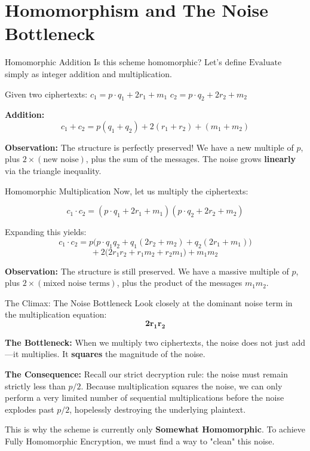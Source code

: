 \documentclass[10pt, aspectratio=169]{beamer}
\begin{document}
\section{Homomorphism and The Noise Bottleneck}
\begin{frame}{Homomorphic Addition}
    Is this scheme homomorphic? Let's define $\text{Evaluate}$ simply as integer addition and multiplication. 
    
    \vspace{0.2cm}
    Given two ciphertexts: 
    $c_1 = p \cdot q_1 + 2r_1 + m_1$ 
    $c_2 = p \cdot q_2 + 2r_2 + m_2$
    \pause
    
    \vspace{0.3cm}
    \textbf{Addition:}
    $$c_1 + c_2 = p(q_1 + q_2) + 2(r_1 + r_2) + (m_1 + m_2)$$
    \pause
    
    \vspace{0.2cm}
    \textbf{Observation:}
    The structure is perfectly preserved! We have a new multiple of $p$, plus $2 \times (\text{new noise})$, plus the sum of the messages. The noise grows \textbf{linearly} via the triangle inequality.
\end{frame}

\begin{frame}{Homomorphic Multiplication}
    Now, let us multiply the ciphertexts:
    
    $$c_1 \cdot c_2 = (p \cdot q_1 + 2r_1 + m_1)(p \cdot q_2 + 2r_2 + m_2)$$
    \pause
    
    Expanding this yields:
    $$c_1 \cdot c_2 = p \big( p \cdot q_1q_2 + q_1(2r_2 + m_2) + q_2(2r_1 + m_1) \big)$$
    $$+ \ 2 \big( 2r_1r_2 + r_1m_2 + r_2m_1 \big) + m_1m_2$$
    \pause
    
    \vspace{0.3cm}
    \textbf{Observation:}
    The structure is still preserved. We have a massive multiple of $p$, plus $2 \times (\text{mixed noise terms})$, plus the product of the messages $m_1m_2$. 
\end{frame}

\begin{frame}{The Climax: The Noise Bottleneck}
    Look closely at the dominant noise term in the multiplication equation:
    $$\mathbf{2r_1r_2}$$
    \pause
    
    \vspace{0.3cm}
    \textbf{The Bottleneck:}
    When we multiply two ciphertexts, the noise does not just add—it multiplies. It \textbf{squares} the magnitude of the noise.
    \pause
    
    \vspace{0.3cm}
    \textbf{The Consequence:}
    Recall our strict decryption rule: the noise must remain strictly less than $p/2$. Because multiplication squares the noise, we can only perform a very limited number of sequential multiplications before the noise explodes past $p/2$, hopelessly destroying the underlying plaintext.
    \pause
    
    \vspace{0.3cm}
    This is why the scheme is currently only \textbf{Somewhat Homomorphic}. To achieve Fully Homomorphic Encryption, we must find a way to "clean" this noise.
\end{frame}
\end{document}
